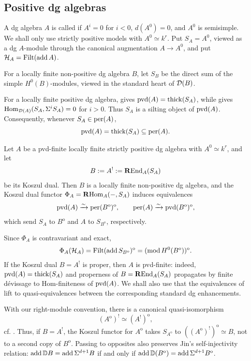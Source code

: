 \documentclass[11pt,a4paper,dvipsnames,x11names]{amsart}
\begin{document}
\subsection{Positive dg algebras}

A dg algebra $A$ is called  if $A^i=0$ for $i<0$, $d(A^0)=0$, and $A^0$ is semisimple. We shall only use strictly positive models with $A^0\simeq k^r$. Put $S_A=A^0$, viewed as a dg $A$-module through the canonical augmentation $A\to A^0$, and put $\mathcal H_A=\operatorname{Filt}(\operatorname{add} A)$.

For a locally finite non-positive dg algebra $B$, let $S_B$ be the direct sum of the simple $H^0(B)$-modules, viewed in the standard heart of $\mathcal D(B)$.

For a locally finite positive dg algebra, \cite[Proposition~5.6]{KN13} gives $\operatorname{pvd}(A)=\operatorname{thick}(S_A)$, while \cite[Lemma~6.2]{KN13} gives $\operatorname{Hom}_{\mathcal D(A)}(S_A,\Sigma^iS_A)=0$ for $i>0$. Thus $S_A$ is a silting object of $\operatorname{pvd}(A)$. Consequently, whenever $S_A\in\operatorname{per}(A)$,
\begin{equation}\label{eq:pvd-thick}
\operatorname{pvd}(A)=\operatorname{thick}(S_A)\subseteq\operatorname{per}(A).
\end{equation}

\begin{thm}\label{thm:Koszul-dual}
Let $A$ be a pvd-finite locally finite strictly positive dg algebra with $A^0\simeq k^r$, and let
\[
B:=A^!:=\operatorname{\mathbf{R}End}_A(S_A)
\]
be its Koszul dual. Then $B$ is a locally finite non-positive dg algebra, and the Koszul dual functor $\Phi_A=\operatorname{\mathbf{R}Hom}_A(-,S_A)$ induces equivalences
\[
\operatorname{pvd}(A)\xrightarrow{\sim}\operatorname{per}(B^{\mathrm{o}})^{\mathrm{o}},
\qquad
\operatorname{per}(A)\xrightarrow{\sim}\operatorname{pvd}(B^{\mathrm{o}})^{\mathrm{o}},
\]
which send $S_A$ to $B^{\mathrm{o}}$ and $A$ to $S_{B^{\mathrm{o}}}$, respectively.
\end{thm}
Since $\Phi_A$ is contravariant and exact,
\[
\Phi_A(\mathcal H_A)=\operatorname{Filt}(\operatorname{add} S_{B^{\mathrm{o}}})^{\mathrm{o}}
=(\operatorname{mod} H^0(B^{\mathrm{o}}))^{\mathrm{o}}.
\]
If the Koszul dual $B=A^!$ is proper, then $A$ is pvd-finite: indeed, $\operatorname{pvd}(A)=\operatorname{thick}(S_A)$ and properness of $B=\operatorname{\mathbf{R}End}_A(S_A)$ propagates by finite d\'evissage to Hom-finiteness of $\operatorname{pvd}(A)$. We shall also use that the equivalences of \cite[Theorem~D]{Fus24} lift to quasi-equivalences between the corresponding standard dg enhancements.

\begin{rmk}\label{rmk:opposite-conventions}
With our right-module convention, there is a canonical quasi-isomorphism
\[
(A^{\mathrm{o}})^!\simeq (A^!)^{\mathrm{o}},
\]
cf. \cite[Remark~4.2]{Fus24}.
Thus, if $B=A^!$, the Koszul functor for $A^{\mathrm{o}}$ takes $S_{A^{\mathrm{o}}}$ to $((A^{\mathrm{o}})^!)^{\mathrm{o}}\simeq B$, not to a second copy of $B^{\mathrm{o}}$. Passing to opposites also preserves Jin's self-injectivity relation: $\operatorname{add}\mathbb D B=\operatorname{add}\Sigma^{d+1}B$ if and only if $\operatorname{add}\mathbb D(B^{\mathrm{o}})=\operatorname{add}\Sigma^{d+1}B^{\mathrm{o}}$.
\end{rmk}
\end{document}
